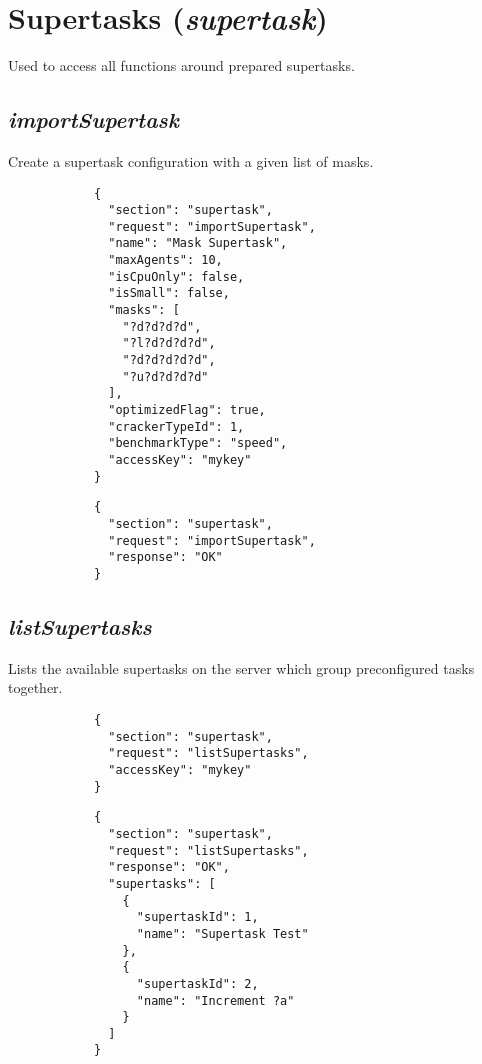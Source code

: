 \section*{Supertasks (\textit{supertask})}
	Used to access all functions around prepared supertasks. 
	\subsection*{\textit{importSupertask}}
		Create a supertask configuration with a given list of masks.
		{
			\color{blue}
			\begin{verbatim}
			{
			  "section": "supertask",
			  "request": "importSupertask",
			  "name": "Mask Supertask",
			  "maxAgents": 10,
			  "isCpuOnly": false,
			  "isSmall": false,
			  "masks": [
			    "?d?d?d?d",
			    "?l?d?d?d?d",
			    "?d?d?d?d?d",
			    "?u?d?d?d?d"
			  ],
			  "optimizedFlag": true,
			  "crackerTypeId": 1,
			  "benchmarkType": "speed",
			  "accessKey": "mykey"
			}
			\end{verbatim}
		}
		{
			\color{OliveGreen}
			\begin{verbatim}
			{
			  "section": "supertask",
			  "request": "importSupertask",
			  "response": "OK"
			}
			\end{verbatim}
		}	
	\subsection*{\textit{listSupertasks}}
		Lists the available supertasks on the server which group preconfigured tasks together.
		{
			\color{blue}
			\begin{verbatim}
			{
			  "section": "supertask",
			  "request": "listSupertasks",
			  "accessKey": "mykey"
			}
			\end{verbatim}
		}
		{
			\color{OliveGreen}
			\begin{verbatim}
			{
			  "section": "supertask",
			  "request": "listSupertasks",
			  "response": "OK",
			  "supertasks": [
			    {
			      "supertaskId": 1,
			      "name": "Supertask Test"
			    },
			    {
			      "supertaskId": 2,
			      "name": "Increment ?a"
			    }
			  ]
			}
			\end{verbatim}
		}
